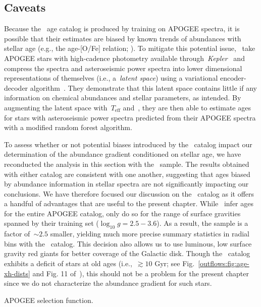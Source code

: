 \subsection{Caveats}
\label{outflows:sec:empirical:caveats}
Because the~\citet{Mackereth2019b} age catalog is produced by training on APOGEE
spectra, it is possible that their estimates are biased by known trends of
abundances with stellar age (e.g., the age-[O/Fe] relation;
\citealt{Feuillet2019}).
To mitigate this potential issue,~\citet{Leung2023} take APOGEE stars with
high-cadence photometry available through~\textit{Kepler}~\citep{Borucki2010}
and compress the spectra and asteroseismic power spectra into lower dimensional
representations of themselves (i.e., a~\textit{latent space}) using a
variational encoder-decoder algorithm~\citep[e.g.,][]{LeCun2015}.
They demonstrate that this latent space contains little if any information on
chemical abundances and stellar parameters, as intended.
By augmenting the latent space with~$T_\text{eff}$ and~\feh, they are then able
to estimate ages for stars with asteroseismic power spectra predicted from
their APOGEE spectra with a modified random forest algorithm.
\par
To assess whether or not potential biases introduced by
the~\citet{Mackereth2019b} catalog impact our determination of the abundance
gradient conditioned on stellar age, we have reconducted the analysis in this
section with the~\citet{Leung2023} sample.
The results obtained with either catalog are consistent with one another,
suggesting that ages biased by abundance information in stellar spectra are not
significantly impacting our conclusions.
We have therefore focused our discussion on the~\citet{Mackereth2019b} catalog
as it offers a handful of advantages that are useful to the present chapter.
While~\citet{Mackereth2019b} infer ages for the entire APOGEE catalog,
\citet{Leung2023} only do so for the range of surface gravities spanned by
their training set ($\log_{10} g = 2.5 - 3.6$).
As a result, the sample is a factor of~$\sim$$2.5$ smaller, yielding much more
precise summary statistics in radial bins with the~\citet{Mackereth2019b}
catalog.
This decision also allows us to use luminous, low surface gravity red giants
for better coverage of the Galactic disk.
Though the~\citet{Mackereth2019b} catalog exhibits a deficit of stars at old
ages (i.e.,~$\gtrsim 10$ Gyr; see Fig.~\ref{outflows:fig:age-xh-dists} and Fig.
11 of~\citealt{Leung2023}), this should not be a problem for the present
chapter since we do not characterize the abundance gradient for such stars.
\par
{\color{red} APOGEE selection function.}

